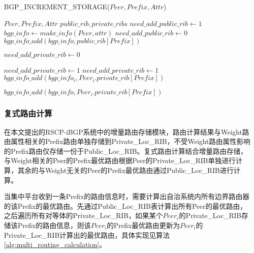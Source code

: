 \begin{algorithm}[!h]
    \caption{BGP\_INCREMENT\_STORAGE($Peer, Prefix, Attr$)}%
    \label{alg:incre_storage}
    \begin{algorithmic}[1]%
        \REQUIRE
        $Peer, Prefix, Attr$
        \ENSURE
        $public\_rib, private\_ribs$
        \STATE $need\_add\_public\_rib \gets 1$
        \STATE $bgp\_info \gets make\_info(Peer, attr)$
        \STATE $need\_add\_public\_rib \gets 0$
        \ENDIF
        \STATE $bgp\_info\_add(bgp\_info, public\_rib[Prefix])$
        \ENDIF

        \STATE $need\_add\_private\_rib \gets 0$

        \STATE $need\_add\_private\_rib \gets 1$
        \ENDIF
        \STATE $need\_add\_private\_rib \gets 1$
        \STATE $bgp\_info\_add(bgp\_info_i, Peer_i.private\_rib[Prefix])$
        \ENDFOR
        \ENDIF

        \STATE $bgp\_info\_add(bgp\_info, Peer_i.private\_rib[Prefix])$
        \ENDIF

        \ENDFOR
    \end{algorithmic}
\end{algorithm}


\subsubsection{复式路由计算}


在本文提出的RSCP-iBGP系统中的增量路由存储模块，路由计算结果与Weight路由属性相关的Prefix路由单独存储到Private\_Loc\_RIB，不受Weight路由属性影响的Prefix路由仅存储一份于Public\_Loc\_RIB。复式路由计算结合增量路由存储，与Weight相关的Peer的Prefix最优路由根据Peer的Private\_Loc\_RIB单独进行计算，其余的与Weight无关的Peer的Prefix最优路由通过Public\_Loc\_RIB进行计算。

当集中平台收到一条Prefix的路由信息时，需要计算出自治系统内所有边界路由器的该Prefix的最优路由。先通过Public\_Loc\_RIB表计算出所有Peer的最优路由，之后遍历所有对等体的Private\_Loc\_RIB，如果某个$Peer_i$的Private\_Loc\_RIB存储该Prefix的路由信息，则该$Peer_i$的Prefix最优路由更新为$Peer_i$的Private\_Loc\_RIB计算出的最优路由，具体实现见算法\ref{alg:multi_routing_calculation}。

